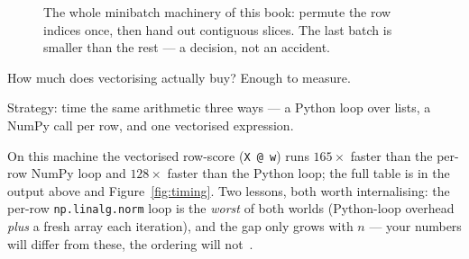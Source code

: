\begin{figure}[ht]\centering
{}
\caption{The whole minibatch machinery of this book: permute the row indices
once, then hand out contiguous slices. The last batch is smaller than the rest
--- a decision, not an accident.}\label{fig:shuffle-batch}
\end{figure}

How much does vectorising actually buy? Enough to measure.





\begin{example}\label{ex:timing}
Strategy: time the same arithmetic three ways --- a Python loop over lists, a
NumPy call per row, and one vectorised expression.\par
\begin{solution}
On this machine the vectorised row-score (\texttt{X @ w}) runs $165\times$
faster than the per-row NumPy loop and $128\times$ faster than the Python
loop; the full table is in the output above and Figure~\ref{fig:timing}. Two
lessons, both worth internalising: the per-row \texttt{np.linalg.norm} loop is
the \emph{worst} of both worlds (Python-loop overhead \emph{plus} a fresh
array each iteration), and the gap only grows with $n$ --- your numbers will
differ from these, the ordering will not~\cite{harris2020}.
\end{solution}
\end{example}

